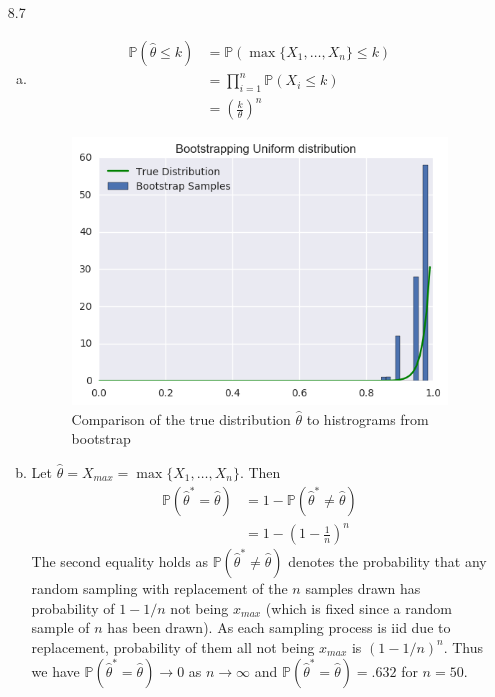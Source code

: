 \documentclass[a4paper,10pt]{article}
\theoremstyle{definition}
\begin{document}
\begin{enumerate}
\item[8.7]
\begin{enumerate}[(a)]
\item 
\begin{align*}
\mathbb{P}(\hat{\theta}\leq k) &= \mathbb{P}(\max\{X_1,\ldots,X_n\}\leq k)\\
&= \prod_{i=1}^{n}\mathbb{P}(X_i\leq k)\\
&=\left(\frac{k}{\theta}\right)^n
\end{align*}
\begin{figure}[h]
\centering
\includegraphics[scale=1]{bootstrap.png}
\caption{Comparison of the true distribution $\hat{\theta}$ to histrograms from bootstrap}
\end{figure}
\item Let $\hat{\theta} = X_{max} = \max\{X_1, \ldots, X_n\}$. Then
\begin{align*}
\mathbb{P}(\hat{\theta}^\ast = \hat{\theta})&=1-\mathbb{P}(\hat{\theta}^\ast \neq \hat{\theta})\\
&=1 - \left(1-\frac{1}{n}\right)^n
\end{align*}
The second equality holds as $\mathbb{P}(\hat{\theta}^\ast \neq \hat{\theta})$ denotes the probability that any random sampling with replacement of the $n$ samples drawn has probability of $1-1/n$ not being $x_{max}$ (which is fixed since a random sample of $n$ has been drawn). As each sampling process is iid due to replacement, probability of them all not being $x_{max}$ is $(1-1/n)^n$. Thus we have $\mathbb{P}(\hat{\theta}^\ast = \hat{\theta}) \to 0$ as $n \to \infty$ and $\mathbb{P}(\hat{\theta}^\ast = \hat{\theta}) = .632$ for $n=50$.
\end{enumerate}

\end{enumerate}
\end{document}
